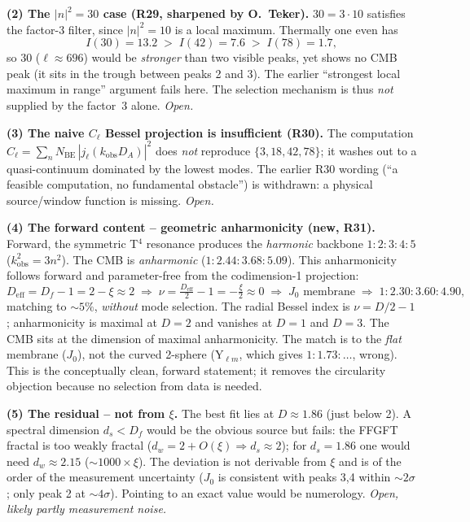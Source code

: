 \textbf{(2) The $|n|^2=30$ case (R29, sharpened by O.~Teker).}
$30=3\cdot10$ satisfies the factor-3 filter, since $|n|^2=10$ is a local
maximum. Thermally one even has
\[
  I(30)=13.2 \;>\; I(42)=7.6 \;>\; I(78)=1.7,
\]
so $30$ ($\ell\approx696$) would be \emph{stronger} than two visible peaks, yet
shows no CMB peak (it sits in the trough between peaks 2 and 3). The earlier
``strongest local maximum in range'' argument fails here. The selection
mechanism is thus \emph{not} supplied by the factor~3 alone. \emph{Open.}

\textbf{(3) The naive $C_\ell$ Bessel projection is insufficient (R30).}
The computation $C_\ell=\sum_n N_\mathrm{BE}\,|j_\ell(k_\mathrm{obs}D_A)|^2$
does \emph{not} reproduce $\{3,18,42,78\}$; it washes out to a quasi-continuum
dominated by the lowest modes. The earlier R30 wording (``a feasible
computation, no fundamental obstacle'') is withdrawn: a physical source/window
function is missing. \emph{Open.}

\textbf{(4) The forward content -- geometric anharmonicity (new, R31).}
Forward, the symmetric T$^4$ resonance produces the \emph{harmonic} backbone
$1:2:3:4:5$ ($k^2_\mathrm{obs}=3n^2$). The CMB is \emph{anharmonic}
($1:2.44:3.68:5.09$). This anharmonicity follows forward and parameter-free
from the codimension-1 projection:
\[
  D_\mathrm{eff}=D_f-1=2-\xi\approx2
  \;\Rightarrow\;
  \nu=\tfrac{D_\mathrm{eff}}{2}-1=-\tfrac{\xi}{2}\approx0
  \;\Rightarrow\;
  J_0\text{ membrane}
  \;\Rightarrow\;
  1:2.30:3.60:4.90,
\]
matching to $\sim5\%$, \emph{without} mode selection. The radial Bessel index is
$\nu=D/2-1$; anharmonicity is maximal at $D=2$ and vanishes at $D=1$ and $D=3$.
The CMB sits at the dimension of maximal anharmonicity. The match is to the
\emph{flat} membrane ($J_0$), not the curved 2-sphere (Y$_{\ell m}$, which gives
$1:1.73:\ldots$, wrong). This is the conceptually clean, forward statement; it
removes the circularity objection because no selection from data is needed.

\textbf{(5) The residual -- not from $\xi$.}
The best fit lies at $D\approx1.86$ (just below 2). A spectral dimension
$d_s<D_f$ would be the obvious source but fails: the FFGFT fractal is too weakly
fractal ($d_w=2+O(\xi)\Rightarrow d_s\approx2$); for $d_s=1.86$ one would need
$d_w\approx2.15$ ($\sim1000\times\xi$). The deviation is not derivable from
$\xi$ and is of the order of the measurement uncertainty ($J_0$ is consistent
with peaks 3,4 within $\sim2\sigma$; only peak 2 at $\sim4\sigma$). Pointing to
an exact value would be numerology. \emph{Open, likely partly measurement
noise.}

